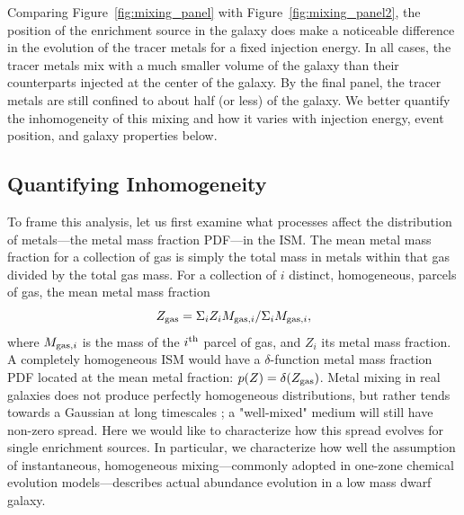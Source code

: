 \documentclass[twocolumn]{aastex62}
\begin{document}
Comparing Figure~\ref{fig:mixing_panel} with Figure~\ref{fig:mixing_panel2}, the position of the enrichment source in the galaxy does make a noticeable difference in the evolution of the tracer metals for a fixed injection energy. In all cases, the tracer metals mix with a much smaller volume of the galaxy than their counterparts injected at the center of the galaxy. By the final panel, the tracer metals are still confined to about half (or less) of the galaxy. We better quantify the inhomogeneity of this mixing and how it varies with injection energy, event position, and galaxy properties below.

\subsection{Quantifying Inhomogeneity}
\label{sec:inhomogeneity}

To frame this analysis, let us first examine what processes affect the distribution of metals---the metal mass fraction PDF---in the ISM. The mean metal mass fraction for a collection of gas is simply the total mass in metals within that gas divided by the total gas mass. For a collection of $i$ distinct, homogeneous, parcels of gas, the mean metal mass fraction 
\begin{equation}Z_{\rm gas} =  \Sigma_i Z_iM_{{\rm gas},i} / \Sigma_i M_{{\rm gas},i}, \end{equation}
where $M_{{\rm gas},i}$ is the mass of the $i^{\rm th}$ parcel of gas, and $Z_{i}$ its metal mass fraction. A completely homogeneous ISM would have a $\delta$-function metal mass fraction PDF located at the mean metal fraction: $p(Z) = \delta(Z_{\rm gas})$. Metal mixing in real galaxies does not produce perfectly homogeneous distributions, but rather tends towards a Gaussian at long timescales \citep[e.g.][]{EswaranPope1988}; a "well-mixed" medium will still have non-zero spread. Here we would like to characterize how this spread evolves for single enrichment sources. In particular, we characterize how well the assumption of instantaneous, homogeneous mixing---commonly adopted in one-zone chemical evolution models---describes actual abundance evolution in a low mass dwarf galaxy.

\end{document}

